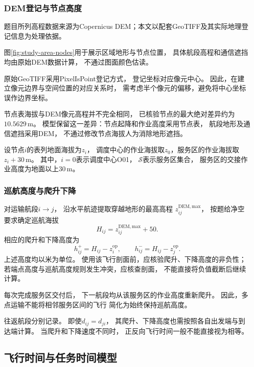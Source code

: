 \documentclass[bwprint]{gmcmthesis}
\begin{document}
\subsubsection{DEM登记与节点高度}
题目所列高程数据来源为Copernicus DEM\cite{copdem}；本文以配套GeoTIFF及其实际地理登记信息为处理依据。


图\ref{fig:study-area-nodes}用于展示区域地形与节点位置，
具体航段高程和通信遮挡均由原始DEM数据计算，
不通过图面颜色估读。

原始GeoTIFF采用PixelIsPoint登记方式，
登记坐标对应像元中心。
因此，在建立像元边界与空间位置的对应关系时，
需考虑半个像元的偏移，避免将中心坐标误作边界坐标。

节点表海拔与DEM像元高程并不完全相同，
已核验节点的最大绝对差异约为$10.5629\,\mathrm{m}$。
模型保留这一差异：节点起降和作业高度采用节点表，
航段地形及通信遮挡采用DEM，
不通过修改节点海拔人为消除地形遮挡。

设节点$i$的表列地面海拔为$z_i$，
调度中心的作业海拔取$z_0$，服务区的作业海拔取$z_i+30\,\mathrm{m}$。
其中，$i=0$表示调度中心O01，
$\mathcal{S}$表示服务区集合，
服务区的交接作业高度为地面以上$30\,\mathrm{m}$。

\subsubsection{巡航高度与爬升下降}

对运输航段$i\to j$，
沿水平航迹提取穿越地形的最高高程
$z_{ij}^{\mathrm{DEM,max}}$，
按题给净空要求确定巡航海拔
\begin{equation}
    H_{ij}
    =
    z_{ij}^{\mathrm{DEM,max}}+50.
\end{equation}
相应的爬升和下降高度为
\begin{equation}
    h_{ij}^{+}
    =
    H_{ij}-z_i^{\mathrm{op}},
    \qquad
    h_{ij}^{-}
    =
    H_{ij}-z_j^{\mathrm{op}}.
\end{equation}
上述高度均以米为单位。
使用该飞行剖面前，应核验爬升、下降高度的非负性；
若端点高度与巡航高度规则发生冲突，应核查剖面，
不能直接将负值截断后继续计算。

每次完成服务区交付后，
下一航段均从该服务区的作业高度重新爬升。
因此，多点运输不能将相邻服务区间的飞行
简化为始终保持巡航高度。

往返航段分别记录。
即使$d_{ij}=d_{ji}$，
其爬升、下降高度也需按照各自出发端与到达端计算。
当爬升和下降速度不同时，
正反向飞行时间一般不能直接视为相等。
\subsection{飞行时间与任务时间模型}
\end{document}
